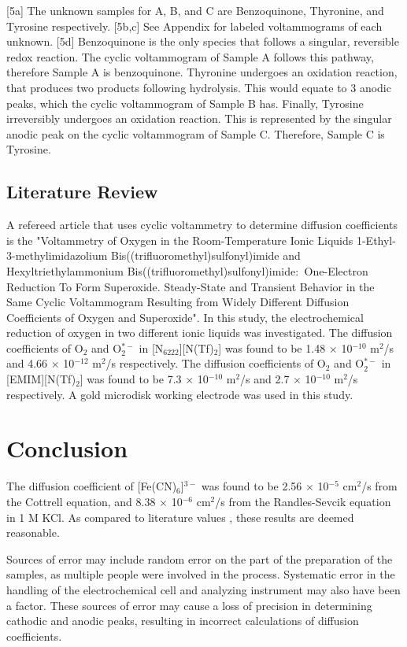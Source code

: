 \documentclass{article}
\begin{document}
\begin{multicols}{2}
{[5a] The unknown samples for A, B, and C are Benzoquinone, Thyronine, and
Tyrosine respectively.
[5b,c] See Appendix for labeled voltammograms of each unknown.
[5d] Benzoquinone is the only species that follows a singular, reversible redox
reaction. The cyclic voltammogram of Sample A follows this pathway, therefore
Sample A is benzoquinone.
Thyronine undergoes an oxidation reaction, that produces two products following
hydrolysis. This would equate to 3 anodic peaks, which the cyclic voltammogram
of Sample B has.
Finally, Tyrosine irreversibly undergoes an oxidation reaction. This is
represented by the singular anodic peak on the cyclic voltammogram of Sample C.
Therefore, Sample C is Tyrosine.


\subsection*{Literature Review}
A refereed article that uses cyclic voltammetry to determine diffusion
coefficients is the "Voltammetry of Oxygen in the Room-Temperature Ionic Liquids
1-Ethyl-3-methylimidazolium Bis((trifluoromethyl)sulfonyl)imide and
Hexyltriethylammonium Bis((trifluoromethyl)sulfonyl)imide:  One-Electron
Reduction To Form Superoxide. Steady-State and Transient Behavior in the Same
Cyclic Voltammogram Resulting from Widely Different Diffusion Coefficients of
Oxygen and Superoxide". \cite{oxy}
In this study, the electrochemical reduction of oxygen in two different ionic
liquids was investigated. The diffusion coefficients of O$_2$ and O$_2^{*-}$ in
[N$_{6222}$][N(Tf)$_2$] was found to be 1.48 $\times$ 10$^{-10}$ m$^2$/s and
4.66 $\times$ 10$^{-12}$ m$^2$/s respectively.
The diffusion coefficients of O$_2$ and O$_2^{*-}$ in [EMIM][N(Tf)$_2$] was
found to be 7.3 $\times$ 10$^{-10}$ m$^2$/s and 2.7 $\times$ 10$^{-10}$ m$^2$/s
respectively.
A gold microdisk working electrode was used in this study.

\section*{Conclusion}
The diffusion coefficient of [Fe(CN)$_6$]$^{3-}$ was found to be 2.56 $\times$
10$^{-5}$ cm$^2$/s from the Cottrell equation, and 8.38 $\times$ 10$^{-6}$
cm$^2$/s from the Randles-Sevcik equation in 1 M KCl. As compared to literature
values \cite{trau}, these results are deemed reasonable.

Sources of error may include random error on the part of the preparation of the
samples, as multiple people were involved in the process. Systematic error in
the handling of the electrochemical cell and analyzing instrument may also have
been a factor. These sources of error may cause a loss of precision in
determining cathodic and anodic peaks, resulting in incorrect calculations of
diffusion coefficients.



}
\end{multicols}
\end{document}
